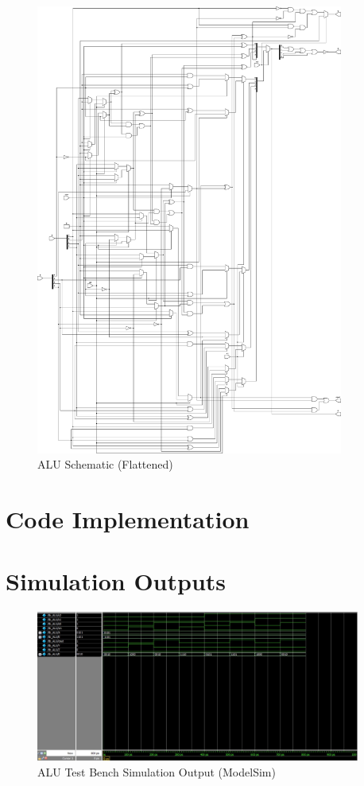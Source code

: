 \documentclass{article}
\begin{document}
\begin{figure}[p]
  \begin{center}
    \includegraphics[width=0.9\textwidth]{figures/ALU-flatten.pdf}
  \end{center}
  \caption{ALU Schematic (Flattened)}
\end{figure}

\newpage

\section{Code Implementation}



\section{Simulation Outputs}

\begin{figure}[H]
  \begin{center}
    \includegraphics[width=0.95\textwidth]{figures/modelsim.jpeg}
  \end{center}
  \caption{ALU Test Bench Simulation Output (ModelSim)}
\end{figure}
\end{document}
